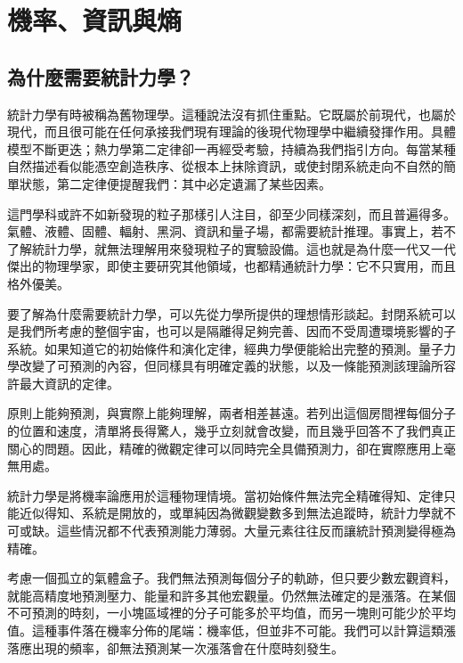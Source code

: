 \chapter{機率、資訊與熵}


\section{為什麼需要統計力學？}

統計力學有時被稱為舊物理學。這種說法沒有抓住重點。它既屬於前現代，也屬於現代，而且很可能在任何承接我們現有理論的後現代物理學中繼續發揮作用。具體模型不斷更迭；熱力學第二定律卻一再經受考驗，持續為我們指引方向。每當某種自然描述看似能憑空創造秩序、從根本上抹除資訊，或使封閉系統走向不自然的簡單狀態，第二定律便提醒我們：其中必定遺漏了某些因素。

這門學科或許不如新發現的粒子那樣引人注目，卻至少同樣深刻，而且普遍得多。氣體、液體、固體、輻射、黑洞、資訊和量子場，都需要統計推理。事實上，若不了解統計力學，就無法理解用來發現粒子的實驗設備。這也就是為什麼一代又一代傑出的物理學家，即使主要研究其他領域，也都精通統計力學：它不只實用，而且格外優美。

要了解為什麼需要統計力學，可以先從力學所提供的理想情形談起。封閉系統可以是我們所考慮的整個宇宙，也可以是隔離得足夠完善、因而不受周遭環境影響的子系統。如果知道它的初始條件和演化定律，經典力學便能給出完整的預測。量子力學改變了可預測的內容，但同樣具有明確定義的狀態，以及一條能預測該理論所容許最大資訊的定律。

原則上能夠預測，與實際上能夠理解，兩者相差甚遠。若列出這個房間裡每個分子的位置和速度，清單將長得驚人，幾乎立刻就會改變，而且幾乎回答不了我們真正關心的問題。因此，精確的微觀定律可以同時完全具備預測力，卻在實際應用上毫無用處。

統計力學是將機率論應用於這種物理情境。當初始條件無法完全精確得知、定律只能近似得知、系統是開放的，或單純因為微觀變數多到無法追蹤時，統計力學就不可或缺。這些情況都不代表預測能力薄弱。大量元素往往反而讓統計預測變得極為精確。

考慮一個孤立的氣體盒子。我們無法預測每個分子的軌跡，但只要少數宏觀資料，就能高精度地預測壓力、能量和許多其他宏觀量。仍然無法確定的是漲落。在某個不可預測的時刻，一小塊區域裡的分子可能多於平均值，而另一塊則可能少於平均值。這種事件落在機率分佈的尾端：機率低，但並非不可能。我們可以計算這類漲落應出現的頻率，卻無法預測某一次漲落會在什麼時刻發生。


